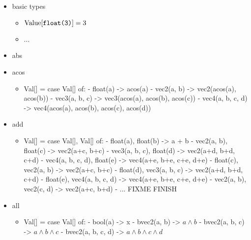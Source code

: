 \documentclass{article}
\begin{document}
\begin{itemize} \item basic types \begin{itemize}
\item $\textrm{Value}[\texttt{float(3)}] = 3$
\item ...

\end{itemize}\item abs \item acos \begin{itemize}
\item Val[] = case Val[] of:
    - float(a) -> acos(a)
    - vec2(a, b) -> vec2(acos(a), acos(b))
    - vec3(a, b, c) -> vec3(acos(a), acos(b), acos(c))
    - vec4(a, b, c, d) -> vec4(acos(a), acos(b), acos(c), acos(d))

\end{itemize}\item add \begin{itemize}
\item Val[] = case Val[], Val[] of:
    - float(a), float(b) -> a + b
    - vec2(a, b), float(c) -> vec2(a+c, b+c)
    - vec3(a, b, c), float(d) -> vec2(a+d, b+d, c+d)
    - vec4(a, b, c, d), float(e) -> vec4(a+e, b+e, c+e, d+e)
    - float(c), vec2(a, b) -> vec2(a+c, b+c)
    - float(d), vec3(a, b, c) -> vec2(a+d, b+d, c+d)
    - float(e), vec4(a, b, c, d) -> vec4(a+e, b+e, c+e, d+e)
    - vec2(a, b), vec2(c, d) -> vec2(a+c, b+d)
    - ... FIXME FINISH

\end{itemize}\item all \begin{itemize}
\item Val[] = case Val[] of:
    - bool(a) -> x
    - bvec2(a, b) -> $a \land b$
    - bvec2(a, b, c) -> $a \land b \land c$
    - bvec2(a, b, c, d) -> $a \land b \land c \land d$


\end{itemize}
\end{itemize}
\end{document}
